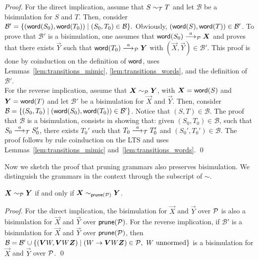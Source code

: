 \begin{proof}
For the direct implication, assume that $S \sim_\mathcal T T$ and let
$\mathcal{B}$ be a bisimulation for $S$ and $T$. Then, consider 
$ \mathcal{B}' = 
\{(\mathsf{word} (S_0), \mathsf{word}(T_0))\mid (S_0,T_0)\in \mathcal{B} \}. $
Obviously, $(\mathsf{word}(S), \mathsf{word}(T))\in \mathcal{B}'$. To prove that
$\mathcal{B}'$ is a bisimulation, one assumes that 
$\word (S_0)\LTSderivesP \vec X $ and proves that there exists
$\vec Y$ such that $\word (T_0)\LTSderivesP \vec Y $
with $(\vec X, \vec Y)\in \mathcal{B}'$. This proof  
is done by coinduction on the definition of $\mathsf{word}$, uses 
Lemmas~\ref{lem:transitions_mimic}, \ref{lem:transitions_words},
and the definition of $\mathcal{B}'$. \smallskip\\
For the reverse implication, assume that 
$\vec X \ProdEquiv \vec Y$, with $\vec X = \word (S)$ and
$\vec Y = \word(T)$ and let $\mathcal{B}'$ be a bisimulation
for $\vec X$ and $\vec Y$. Then, consider
$\mathcal{B} = \{(S_0, T_0)\mid (\mathsf{word}(S_0),\mathsf{word}(T_0))\in \mathcal{B}'\}$.
Notice that $(S,T)\in \mathcal{B}$.
The proof that $\mathcal{B}$ is a bisimulation, consists in showing that:
given $(S_0, T_0)\in \mathcal{B}$, such that $S_0\stackrel{a}{\longrightarrow}_\mathcal T S_0'$,
there exists $T_0'$ such that $T_0\stackrel{a}{\longrightarrow}_\mathcal T T_0'$
and $(S_0',T_0')\in \mathcal{B}$. The proof
follows by rule coinduction on the LTS and uses 
Lemmas~\ref{lem:transitions_mimic} and~\ref{lem:transitions_words}. \qed 
\end{proof}

Now we sketch the proof that pruning grammars also preserves bisimulation.
We distinguish the grammars in the context through the subscript of $\sim$.

\begin{theorem}
	\label{thm:pruning_preserves_bisim}
	$\vec X \bisimP \vec Y$ if and only if $\vec X \sim_{\Prune(\productions)} \vec Y$.
\end{theorem}

\begin{proof}
For the direct implication, the bisimulation for $\vec X$ and $\vec Y$ over
$\mathcal P$ is also a bisimulation for $\vec X$ and $\vec Y$ over
$\mathsf{prune}(\mathcal P)$. For the reverse implication, if $\mathcal{B}'$
is a bisimulation for $\vec X$ and $\vec Y$ over $\mathsf{prune}(\mathcal P)$,
then $\mathcal{B} = \mathcal{B}' \cup 
\{(\vec V W, \vec V W \vec Z) \mid  (W\rightarrow \vec V W \vec Z) \in \productions, 
\text{ $W$ unnormed} \}$ 
is a bisimulation for $\vec X$ and $\vec Y$ over $\mathcal P$. \qed
\end{proof}


